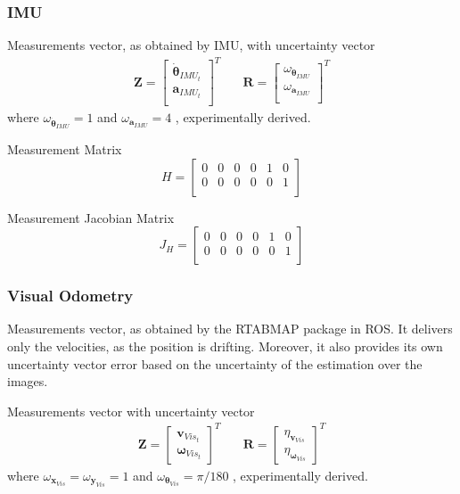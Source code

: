 \subsubsection{IMU}

\noindent 
Measurements vector, as obtained by IMU, with uncertainty vector
\begin{align}
\mathbf{Z}
=
\begin{bmatrix} 
\dot{\boldsymbol \theta }_{IMU_t} \\ 
\mathbf{a}_{IMU_t} \\ 
\end{bmatrix}^T
& \quad
\mathbf{R}
=
\begin{bmatrix} 
\omega_{\dot{\boldsymbol \theta}_{IMU}} \\ 
\omega_{\mathbf{a}_{IMU}} \\ 
\end{bmatrix}^T
\end{align}
where $ \omega_{\dot{\boldsymbol \theta}_{IMU}} = 1$ and 
$ \omega_{\mathbf{a}_{IMU}} = 4 $ , experimentally derived.


Measurement Matrix
\begin{equation}
H
=
\begin{bmatrix} 
0 & 0 & 0 & 0 & 1 & 0 \\ 
0 & 0 & 0 & 0 & 0 & 1 \\ 
\end{bmatrix}
\end{equation}

Measurement Jacobian Matrix
\begin{equation}
J_H
=
\begin{bmatrix} 
0 & 0 & 0 & 0 & 1 & 0 \\ 
0 & 0 & 0 & 0 & 0 & 1 \\ 
\end{bmatrix}
\end{equation}

\subsubsection{Visual Odometry}
\noindent 
Measurements vector, as obtained by the \gls{RTABMAP} package in \gls{ROS}.
It delivers only the velocities, as the position is drifting. Moreover, it also provides its own uncertainty vector error based on the uncertainty of the estimation over the images.

Measurements vector with uncertainty vector
\begin{align}
\mathbf{Z}
=
\begin{bmatrix} 
\mathbf{v}_{Vis_t} \\
\boldsymbol \omega_{Vis_t} 
\end{bmatrix}^T
& \quad
\mathbf{R}
=
\begin{bmatrix} 
\eta_{\mathbf{v}_{Vis}} \\ 
\eta_{\boldsymbol \omega_{Vis}} 
\end{bmatrix}^T
\end{align}
where $ \omega_{\mathbf{x}_{Vis}} = \omega_{\mathbf{y}_{Vis}} = 1$ and 
$ \omega_{\boldsymbol \theta_{Vis}} = \pi/180 $ , experimentally derived.



